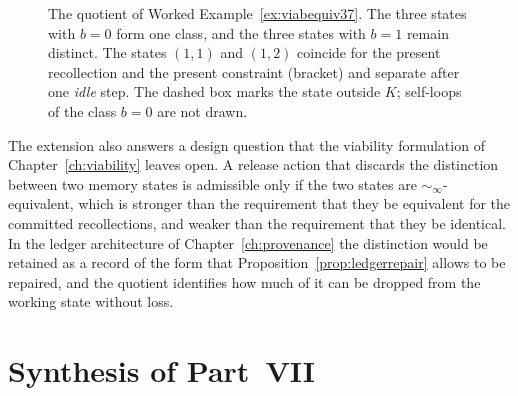 \begin{figure}[t]
\centering
{}
\caption{The quotient of Worked Example~\ref{ex:viabequiv37}. The three states with $b=0$ form one class, and the three states with $b=1$ remain distinct. The states $(1,1)$ and $(1,2)$ coincide for the present recollection and the present constraint (bracket) and separate after one \emph{idle} step. The dashed box marks the state outside $K$; self-loops of the class $b=0$ are not drawn.}\label{fig:viabquot}
\end{figure}

The extension also answers a design question that the viability formulation of Chapter~\ref{ch:viability} leaves open. A release action that discards the distinction between two memory states is admissible only if the two states are $\sim_\infty$-equivalent, which is stronger than the requirement that they be equivalent for the committed recollections, and weaker than the requirement that they be identical. In the ledger architecture of Chapter~\ref{ch:provenance} the distinction would be retained as a record of the form that Proposition~\ref{prop:ledgerrepair} allows to be repaired, and the quotient identifies how much of it can be dropped from the working state without loss.


\section*{Synthesis of Part~VII}\label{sec:synth7}


